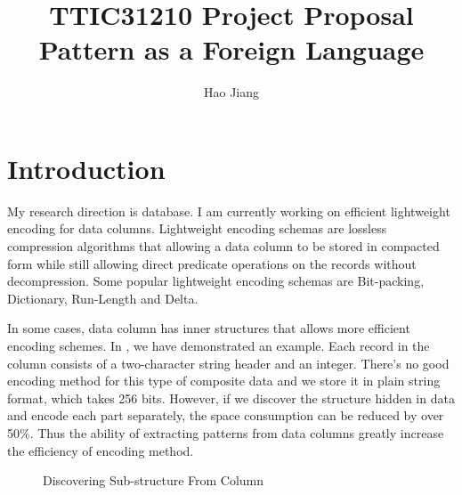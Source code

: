 \documentclass{article}
\title{TTIC31210 Project Proposal \\ 
\vspace{2mm} 
\Large{Pattern as a Foreign Language}}
\date{}
\author{Hao Jiang}
\begin{document}
\maketitle

\section{Introduction}

My research direction is database. I am currently working on
efficient lightweight encoding for data columns. Lightweight encoding schemas
are lossless compression algorithms that allowing a data column to be stored
in compacted form while still allowing direct predicate operations on the
records without decompression. Some popular lightweight encoding schemas are
Bit-packing, Dictionary, Run-Length and Delta.

In some cases, data column has inner structures that allows more efficient
encoding schemes. In , we have demonstrated an example. Each
record in the column consists of a two-character string header and an integer.
There's no good encoding method for this type of composite data and we store it
in plain string format, which takes 256 bits. However, if we discover the
structure hidden in data and encode each part separately, the space consumption
can be reduced by over 50\%. Thus the ability of extracting patterns from data
columns greatly increase the efficiency of encoding method.

\begin{figure}
\centering
{}
\caption{Discovering Sub-structure From Column}
\label{fig:example}
\end{figure}
\end{document}

